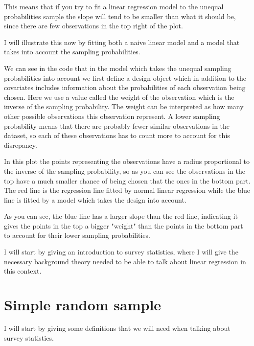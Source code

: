 \documentclass{article}
\begin{document}


This means that if you try to fit a linear regression model to the unequal probabilities sample the slope will tend to be smaller than what it should be, since there are few observations in the top right of the plot.

I will illustrate this now by fitting both a naive linear model and a model that takes into account the sampling probabilities.



We can see in the code that in the model which takes the unequal sampling probabilities into account we first define a design object which in addition to the covariates includes information about the probabilities of each observation being chosen. Here we use a value called the weight of the observation which is the inverse of the sampling probability. The weight can be interpreted as how many other possible observations this observation represent. A lower sampling probability means that there are probably fewer similar observations in the dataset, so each of these observations has to count more to account for this disrepancy.

In this plot the points representing the observations have a radius proportional to the inverse of the sampling probability, so as you can see the observations in the top have a much smaller chance of being chosen that the ones in the bottom part. The red line is the regression line fitted by normal linear regression while the blue line is fitted by a model which takes the design into account. 

As you can see, the blue line has a larger slope than the red line, indicating it gives the points in the top a bigger "weight" than the points in the bottom part to account for their lower sampling probabilities.


I will start by giving an introduction to survey statistics, where I will give the necessary background theory needed to be able to talk about linear regression in this context.

\section{Simple random sample}

I will start by giving some definitions that we will need when talking about survey statistics.
\end{document}
